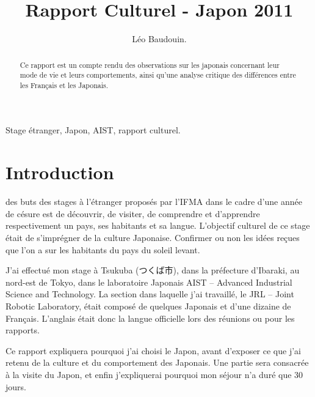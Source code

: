 \documentclass[journal]{RapportFR}
\begin{document}
\begin{CJK*}{UTF8}{min}

\title{Rapport Culturel - Japon 2011}


\author{L\'{e}o Baudouin.}


\maketitle


\begin{abstract}
Ce rapport est un compte rendu des observations sur les japonais concernant leur mode de vie et leurs comportements, ainsi qu'une analyse critique des diff\'erences entre les Fran\c cais et les Japonais.

\end{abstract}

\begin{IEEEkeywords}
Stage \'etranger, Japon, AIST, rapport culturel.
\end{IEEEkeywords}



\section{Introduction}


 des buts des stages \`a l'\'etranger propos\'es par l'IFMA dans le cadre d'une ann\'ee de c\'esure est de d\'ecouvrir, de visiter, de comprendre et d'apprendre respectivement un pays, ses habitants et sa langue.
L'objectif culturel de ce stage \'etait de s'impr\'egner de la culture Japonaise. Confirmer ou non les id\'ees re\c cues que l'on a sur les habitants du pays du soleil levant.

J'ai effectu\'e mon stage \`a Tsukuba (つくば市), dans la pr\'efecture d'Ibaraki, au nord-est de Tokyo, dans le laboratoire Japonais AIST -- Advanced Industrial Science and Technology. La section dans laquelle j'ai travaillé, le JRL -- Joint Robotic Laboratory, \'etait compos\'e de quelques Japonais et d'une dizaine de Fran\c cais. L'anglais \'etait donc la langue officielle lors des r\'eunions ou pour les rapports. 

Ce rapport expliquera pourquoi j'ai choisi le Japon, avant d'exposer ce que j'ai retenu de la culture et du comportement des Japonais. Une partie sera consacr\'ee \`a la visite du Japon, et enfin j'expliquerai pourquoi mon s\'ejour n'a dur\'e que 30 jours.


\end{CJK*}
\end{document}
